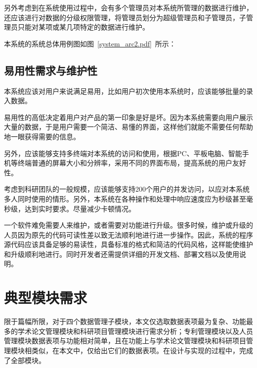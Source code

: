 另外考虑到在系统使用过程中，会有多个管理员对本系统所管理的数据进行维护，还应该进行对数据的分级权限管理，将管理员划分为超级管理员和子管理员，子管理员只能对某项或某几项特定的数据进行维护。

本系统的系统总体用例图如图~\ref{system_arc2.pdf}~所示：



\subsection{易用性需求与维护性}

本系统应该对用户来说满足易用，比如用户初次使用本系统时，应该能够批量的录入数据。

易用性的高低决定着用户对产品的第一印象是好是坏。因为本系统需要向用户展示大量的数据，于是用户需要一个简洁、易懂的界面，这样他们就能不需要任何帮助地一眼获得需要的信息。

另外，应该能够支持多终端对本系统的访问和使用，根据PC、平板电脑、智能手机等终端普通的屏幕大小和分辨率，采用不同的界面布局，提高系统的用户友好性。

考虑到科研团队的一般规模，应该能够支持200个用户的并发访问，以应对本系统多人同时使用的情形。另外，本系统在各种操作和处理中响应速度应为秒级甚至毫秒级，达到实时要求。尽量减少卡顿情况。

一个软件难免需要人来维护，或者需要对功能进行升级。很多时候，维护或升级的人员因为原先的代码可读性差以致无法顺利地进行进一步操作。因此，系统的程序源代码应该具备足够的易读性，具备标准的格式和简洁的代码风格，这样能使维护和升级顺利地进行。同时开发者还需提供详细的开发文档、部署文档以及使用说明。




\section{典型模块需求}

限于篇幅所限，对于四个数据管理子模块，本文仅选取数据表项最为复杂、功能最多的学术论文管理模块和科研项目管理模块进行需求分析；专利管理模块以及人员管理模块数据表项与功能相对简单，且在功能上与学术论文管理模块和科研项目管理模块相类似，在本文中，仅给出它们的数据表项。在设计与实现的过程中，完成了全部模块。
